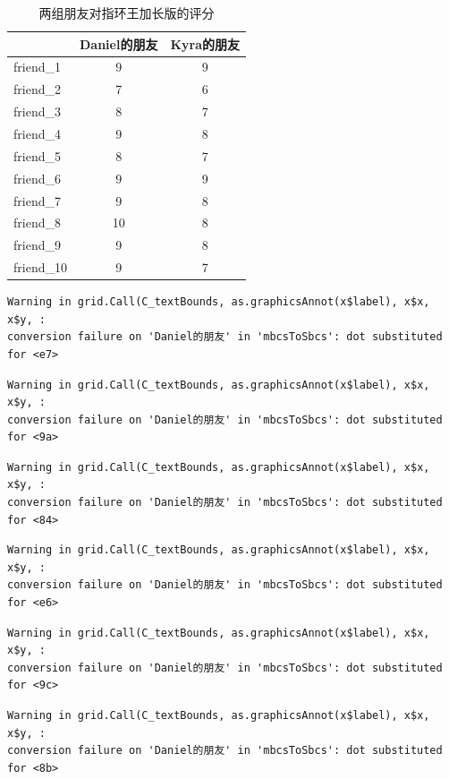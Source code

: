 \documentclass[
  letterpaper,
  DIV=11,
  numbers=noendperiod]{scrreprt}
\begin{document}
\begin{table}

\caption{两组朋友对指环王加长版的评分}
\begin{tabular}[t]{lcc}
\toprule
 & Daniel的朋友 & Kyra的朋友\\
\midrule
friend\_1 & 9 & 9\\
friend\_2 & 7 & 6\\
friend\_3 & 8 & 7\\
friend\_4 & 9 & 8\\
friend\_5 & 8 & 7\\
\addlinespace
friend\_6 & 9 & 9\\
friend\_7 & 9 & 8\\
friend\_8 & 10 & 8\\
friend\_9 & 9 & 8\\
friend\_10 & 9 & 7\\
\bottomrule
\end{tabular}
\end{table}

\begin{verbatim}
Warning in grid.Call(C_textBounds, as.graphicsAnnot(x$label), x$x, x$y, :
conversion failure on 'Daniel的朋友' in 'mbcsToSbcs': dot substituted for <e7>
\end{verbatim}

\begin{verbatim}
Warning in grid.Call(C_textBounds, as.graphicsAnnot(x$label), x$x, x$y, :
conversion failure on 'Daniel的朋友' in 'mbcsToSbcs': dot substituted for <9a>
\end{verbatim}

\begin{verbatim}
Warning in grid.Call(C_textBounds, as.graphicsAnnot(x$label), x$x, x$y, :
conversion failure on 'Daniel的朋友' in 'mbcsToSbcs': dot substituted for <84>
\end{verbatim}

\begin{verbatim}
Warning in grid.Call(C_textBounds, as.graphicsAnnot(x$label), x$x, x$y, :
conversion failure on 'Daniel的朋友' in 'mbcsToSbcs': dot substituted for <e6>
\end{verbatim}

\begin{verbatim}
Warning in grid.Call(C_textBounds, as.graphicsAnnot(x$label), x$x, x$y, :
conversion failure on 'Daniel的朋友' in 'mbcsToSbcs': dot substituted for <9c>
\end{verbatim}

\begin{verbatim}
Warning in grid.Call(C_textBounds, as.graphicsAnnot(x$label), x$x, x$y, :
conversion failure on 'Daniel的朋友' in 'mbcsToSbcs': dot substituted for <8b>
\end{verbatim}
\end{document}
